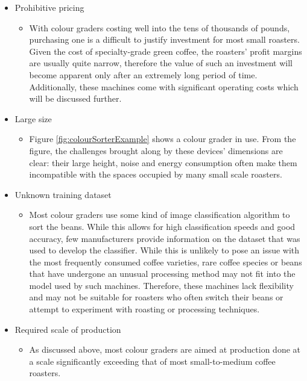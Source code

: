\begin{itemize}
    \item Prohibitive pricing
    \begin{itemize}
        \item With colour graders costing well into the tens of thousands of pounds,
        purchasing one is a difficult to justify investment for most small roasters.
        Given the cost of specialty-grade green coffee, the roasters' profit margins are usually
        quite narrow, therefore the value of such an investment will become apparent only after an extremely long period of time.
        Additionally, these machines come with significant operating costs which will be discussed further.
    \end{itemize}
    \item Large size
    \begin{itemize}
        \item Figure \ref{fig:colourSorterExample} shows a colour grader in use.
        From the figure, the challenges brought along by these devices' dimensions are clear:
        their large height, noise and energy consumption often make them incompatible with the spaces occupied by many
        small scale roasters.
    \end{itemize}
    \item Unknown training dataset
    \begin{itemize}
        \item Most colour graders use some kind of image classification algorithm to sort the beans.
        While this allows for high classification speeds and good accuracy, few manufacturers provide information on the
        dataset that was used to develop the classifier.
        While this is unlikely to pose an issue with the most frequently consumed coffee varieties,
        rare coffee species or beans that have undergone an unusual processing method may not fit into the model used by such machines.
        Therefore, these machines lack flexibility and may not be suitable for roasters who often switch their beans or
        attempt to experiment with roasting or processing techniques.
    \end{itemize}
    \item Required scale of production
    \begin{itemize}
        \item As discussed above, most colour graders are aimed at production done at a scale
        significantly exceeding that of most small-to-medium coffee roasters.

\end{itemize}
\end{itemize}
